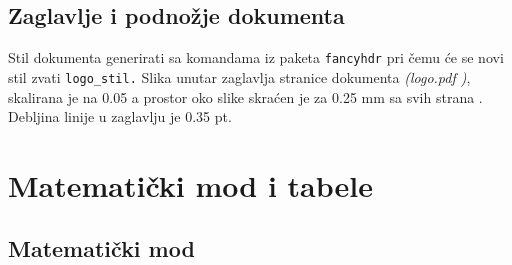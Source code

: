 \documentclass{article}
\newcommand{\newsize}[1]{\fontsize{8pt}{21pt}\selectfont{#1}}
\newcommand{\newtodo}[1]{\todo{\newsize{#1}}}
\begin{document}
\vspace{2mm}
\subsection{Zaglavlje i podnožje dokumenta}
Stil dokumenta generirati sa komandama iz paketa \texttt{fancyhdr} pri čemu će se novi stil zvati \texttt{logo{\_}stil.}
Slika unutar zaglavlja stranice dokumenta \textsl{(logo.pdf )}, skalirana je na 0.05 a prostor oko slike skraćen je za 0.25 mm sa svih strana . 
\newtodo{ Upotrijebiti trim \& clip opcije} Debljina linije u zaglavlju je 0.35 pt.

\section{Matematički mod i tabele}
\subsection{Matematički mod}
\end{document}
